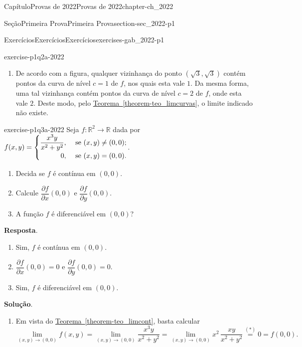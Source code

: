 \documentclass[oneside,10pt,]{book}
\newcommand{\blocktitlefont}{\relax}
\newcommand{\xreffont}{\relax}
\numberwithin{equation}{section}
\newcommand{\R}{\mathbb R}
\begin{document}
\begin{chapterptx}{Capítulo}{Provas de 2022}{}{Provas de 2022}{}{}{chapter-ch_2022}
\begin{sectionptx}{Seção}{Primeira Prova}{}{Primeira Prova}{}{}{section-sec_2022-p1}
\begin{exercises-subsection-numberless}{Exercícios}{Exercícios}{}{Exercícios}{}{}{exercises-gab_2022-p1}
\begin{divisionexercise}{2}{}{}{exercise-p1q2a-2022}
\begin{enumerate}[label=\alph*]
\item{}De acordo com a figura, qualquer vizinhança do ponto \((\sqrt{3},\sqrt{3})\) contém pontos da curva de nível \(c=1\) de \(f\), nos quais esta vale \(1\). Da mesma forma, uma tal vizinhança contém pontos da curva de nível \(c=2\) de \(f\), onde esta vale \(2\). Deste modo, pelo \hyperref[theorem-teo_limcurvas]{Teorema~{\xreffont\ref{theorem-teo_limcurvas}}}, o limite indicado não existe.%
\end{enumerate}
\end{divisionexercise}%
\begin{divisionexercise}{3}{}{}{exercise-p1q3a-2022}%
Seja \(f\colon\R^2\to\R\) dada por \(f(x,y)=
\begin{cases}
\dfrac{x^3y}{x^2+y^2},&\text{ se $(x,y)\neq (0,0)$;}\\
\hfill 0,&\text{ se $(x,y)= (0,0)$}.
\end{cases}\). %
\begin{enumerate}[label=\alph*]
\item{}Decida se \(f\) é contínua em \((0,0)\).%
\item{}Calcule \(\dfrac{\partial f}{\partial x}(0,0)\) e \(\dfrac{\partial f}{\partial y}(0,0)\).%
\item{}A função \(f\) é diferenciável em \((0,0)\)?%
\end{enumerate}
\par\smallskip%
\noindent\textbf{\blocktitlefont Resposta}.\hypertarget{answer-p1q3a-2022-b}{}\quad{}%
\begin{enumerate}[label=\alph*]
\item{}Sim, \(f\) é contínua em \((0,0)\).%
\item{}\(\dfrac{\partial f}{\partial x}(0,0)=0\) e \(\dfrac{\partial f}{\partial y}(0,0)=0\).%
\item{}Sim, \(f\) é diferenciável em \((0,0)\).%
\end{enumerate}
\par\smallskip%
\noindent\textbf{\blocktitlefont Solução}.\hypertarget{solution-p1q3a-2022-c}{}\quad{}%
\begin{enumerate}[label=\alph*]
\item{}Em vista do \hyperref[theorem-teo_limcont]{Teorema~{\xreffont\ref{theorem-teo_limcont}}}, basta calcular%
\begin{equation*}
\lim\limits_{(x,y)\to(0,0)} f(x,y)
=\lim\limits_{(x,y)\to(0,0)}\dfrac{x^3y}{x^2+y^2}
=\lim\limits_{(x,y)\to(0,0)}x^2\,\dfrac{xy}{x^2+y^2}\stackrel{(\ast)}{=}0=f(0,0).
\end{equation*}

\end{enumerate}
\end{divisionexercise}
\end{exercises-subsection-numberless}
\end{sectionptx}
\end{chapterptx}
\end{document}
